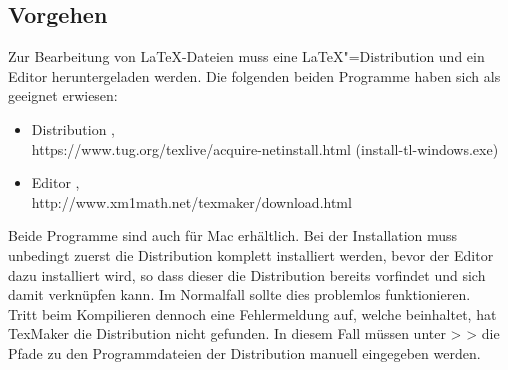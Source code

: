 \subsection{Vorgehen}
%
Zur Bearbeitung von \LaTeX -Dateien muss eine \LaTeX "=Distribution und ein Editor heruntergeladen werden. Die folgenden beiden Programme haben sich als geeignet erwiesen:%
%
\begin{itemize}
\item Distribution , \\ https://www.tug.org/texlive/acquire-netinstall.html (install-tl-windows.exe)%
\item Editor , \\ http://www.xm1math.net/texmaker/download.html%
\end{itemize}
%
Beide Programme sind auch für Mac erhältlich. Bei der Installation muss unbedingt zuerst die Distribution komplett installiert werden, bevor der Editor dazu installiert wird, so dass dieser die Distribution bereits vorfindet und sich damit verknüpfen kann. Im Normalfall sollte dies problemlos funktionieren.\\%
Tritt beim Kompilieren dennoch eine Fehlermeldung auf, welche  beinhaltet, hat TexMaker die Distribution nicht gefunden. In diesem Fall müssen unter  >  >  die Pfade zu den Programmdateien der Distribution manuell eingegeben werden.%
%

